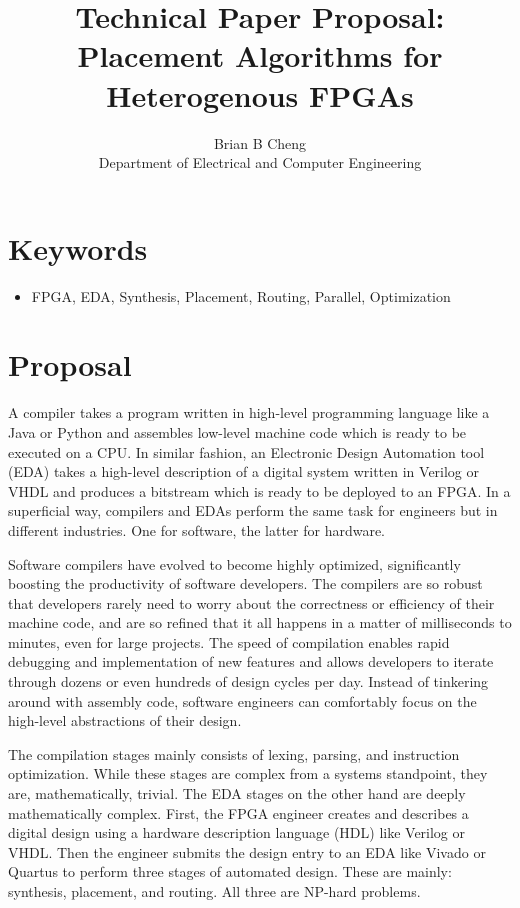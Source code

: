 \documentclass{article}
\begin{document}
\title{Technical Paper Proposal: \\ Placement Algorithms for Heterogenous FPGAs}
\author{Brian B Cheng \\ Department of Electrical and Computer Engineering}


\date{}
\maketitle

\section{Keywords}
\begin{itemize}
    \item FPGA, EDA, Synthesis, Placement, Routing, Parallel, Optimization
\end{itemize}


\section{Proposal}
A compiler takes a program written in high-level programming language like a Java or Python and assembles low-level machine code which is ready to be executed on a CPU.
In similar fashion, an Electronic Design Automation tool (EDA) takes a high-level description of a digital system written in Verilog or VHDL and produces a bitstream which is ready to be deployed to an FPGA.
In a superficial way, compilers and EDAs perform the same task for engineers but in different industries. 
One for software, the latter for hardware.

Software compilers have evolved to become highly optimized, significantly boosting the productivity of software developers. 
The compilers are so robust that developers rarely need to worry about the correctness or efficiency of their machine code, and are so refined that it all happens in a matter of milliseconds to minutes, even for large projects. %
The speed of compilation enables rapid debugging and implementation of new features and allows developers to iterate through dozens or even hundreds of design cycles per day.
Instead of tinkering around with assembly code, software engineers can comfortably focus on the high-level abstractions of their design. 

The compilation stages mainly consists of lexing, parsing, and instruction optimization.
While these stages are complex from a systems standpoint, they are, mathematically, trivial.
The EDA stages on the other hand are deeply mathematically complex. 
First, the FPGA engineer creates and describes a digital design using a hardware description language (HDL) like Verilog or VHDL.     
Then the engineer submits the design entry to an EDA like Vivado or Quartus to perform three stages of automated design. 
These are mainly: synthesis, placement, and routing. 
All three are NP-hard problems.
\end{document}
